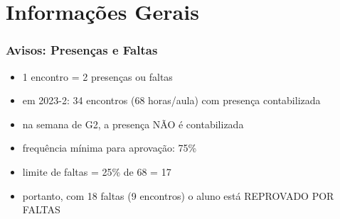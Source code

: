 \documentclass[aspectratio=169]{beamer}
\begin{document}

\section{Informa\c{c}\~oes Gerais}

\begin{frame}\frametitle{Avisos: Presenças e Faltas}
\begin{itemize}
	\item 1 encontro = 2 presen\c{c}as ou faltas
	\item em 2023-2: 34 encontros (68 horas/aula) com presença contabilizada
	\item na semana de G2, a presença NÃO é contabilizada
	\item frequ\^encia m\'inima para aprova\c{c}\~ao: 75\%
	\item limite de faltas = 25\% de 68 = 17
	\item portanto, com 18 faltas (9 encontros) o aluno está REPROVADO POR FALTAS
\end{itemize}
\end{frame}
\end{document}
